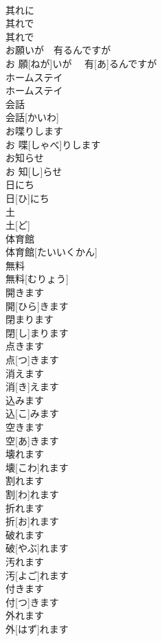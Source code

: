 \documentclass[8pt]{extreport}
\begin{document}
\begin{CJK}{UTF8}{min}
\\	其れに	
\\	其れで	
\\	其れで	
\\	お願いが　有るんですが	
\\	お 願[ねが]いが　 有[あ]るんですが	
\\	ホームステイ	
\\	ホームステイ	
\\	会話	
\\	会話[かいわ]	
\\	お喋りします
\\	お 喋[しゃべ]りします
\\	お知らせ	
\\	お 知[し]らせ	
\\	日にち	
\\	日[ひ]にち	
\\	土	
\\	土[ど]	
\\	体育館	
\\	体育館[たいいくかん]	
\\	無料	
\\	無料[むりょう]	
\\	開きます	
\\	開[ひら]きます	
\\	閉まります	
\\	閉[し]まります	
\\	点きます	
\\	点[つ]きます	
\\	消えます	
\\	消[き]えます	
\\	込みます	
\\	込[こ]みます	
\\	空きます	
\\	空[あ]きます	
\\	壊れます	
\\	壊[こわ]れます	
\\	割れます	
\\	割[わ]れます	
\\	折れます	
\\	折[お]れます	
\\	破れます	
\\	破[やぶ]れます	
\\	汚れます	
\\	汚[よご]れます	
\\	付きます	
\\	付[つ]きます	
\\	外れます	
\\	外[はず]れます	

\end{CJK}
\end{document}
